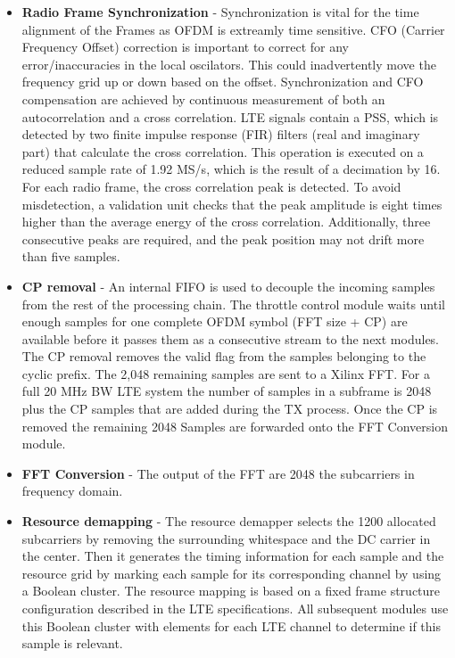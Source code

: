 \begin{itemize}
    \item \textbf{Radio Frame Synchronization} -
        Synchronization is vital for the time alignment of the Frames as OFDM is extreamly time sensitive. CFO (Carrier Frequency Offset) correction is important to correct for any error/inaccuracies in the local oscilators. This could inadvertently move the frequency grid up or down based on the offset. Synchronization and CFO compensation are achieved by continuous measurement of both an autocorrelation and a cross correlation. LTE signals contain a PSS, which is detected by two finite impulse response (FIR) filters (real and imaginary part) that calculate the cross correlation. This operation is executed on a reduced sample rate of 1.92 MS/s, which is the result of a decimation by 16. For each radio frame, the cross correlation peak is detected. To avoid misdetection, a validation unit checks that the peak amplitude is eight times higher than the average energy of the cross correlation. Additionally, three consecutive peaks are required, and the peak position may not drift more than five samples.
    \item \textbf{CP removal} -
        An internal FIFO is used to decouple the incoming samples from the rest of the processing chain. The throttle control module waits until enough samples for one complete OFDM symbol (FFT size + CP) are available before it passes them as a consecutive stream to the next modules. The CP removal removes the valid flag from the samples belonging to the cyclic prefix. The 2,048 remaining samples are sent to a Xilinx FFT. For a full 20 \si{\mega\hertz} BW LTE system the number of samples in a subframe is 2048 plus the CP samples that are added during the TX process. Once the CP is removed the remaining 2048 Samples are forwarded onto the FFT Conversion module.
    \item \textbf{FFT Conversion} -
        The output of the FFT are 2048 the subcarriers in frequency domain.
    \item \textbf{Resource demapping} -
        The resource demapper selects the 1200 allocated subcarriers by removing the surrounding whitespace and the DC carrier in the center. Then it generates the timing information for each sample and the resource grid by marking each sample for its corresponding channel by using a Boolean cluster. The resource mapping is based on a fixed frame structure configuration described in the LTE specifications. All subsequent modules use this Boolean cluster with elements for each LTE channel to determine if this sample is relevant.

\end{itemize}
